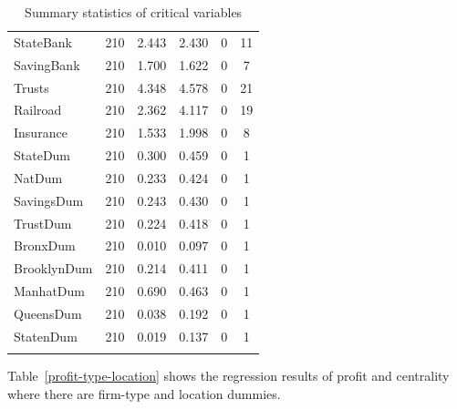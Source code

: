 \begin{subappendices}
\begin{table}[h!]
\begin{tabular}{lccccc}
StateBank & 210 & 2.443 & 2.430 & 0 & 11 \\
SavingBank & 210 & 1.700 & 1.622 & 0 & 7 \\
Trusts & 210 & 4.348 & 4.578 & 0 & 21 \\
Railroad & 210 & 2.362 & 4.117 & 0 & 19 \\
Insurance & 210 & 1.533 & 1.998 & 0 & 8 \\
StateDum & 210 & 0.300 & 0.459 & 0 & 1 \\
NatDum & 210 & 0.233 & 0.424 & 0 & 1 \\
SavingsDum & 210 & 0.243 & 0.430 & 0 & 1 \\
TrustDum & 210 & 0.224 & 0.418 & 0 & 1 \\
BronxDum & 210 & 0.010 & 0.097 & 0 & 1 \\
BrooklynDum & 210 & 0.214 & 0.411 & 0 & 1 \\
ManhatDum & 210 & 0.690 & 0.463 & 0 & 1 \\
QueensDum & 210 & 0.038 & 0.192 & 0 & 1 \\
StatenDum & 210 & 0.019 & 0.137 & 0 & 1 \\
\hline \\[-1.8ex]
\end{tabular}
\label{fin-ss}
\caption{Summary statistics of critical variables}
\end{table}

Table~\ref{profit-type-location} shows the regression results of profit and centrality where there are firm-type and location dummies.


\end{subappendices}
